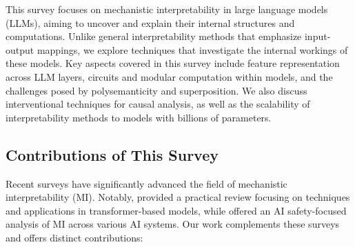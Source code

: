 \documentclass[sigconf,authoryear]{acmart}
\begin{document}
This survey focuses on mechanistic interpretability in large language models (LLMs), aiming to uncover and explain their internal structures and computations. Unlike general interpretability methods that emphasize input-output mappings, we explore techniques that investigate the internal workings of these models. Key aspects covered in this survey include feature representation across LLM layers, circuits and modular computation within models, and the challenges posed by polysemanticity and superposition. We also discuss interventional techniques for causal analysis, as well as the scalability of interpretability methods to models with billions of parameters.


\subsection{Contributions of This Survey}

Recent surveys have significantly advanced the field of mechanistic interpretability (MI). Notably, \citet{rai2024practicalreviewmechanisticinterpretability} provided a practical review focusing on techniques and applications in transformer-based models, while \citet{bereska_mechanistic_2024} offered an AI safety-focused analysis of MI across various AI systems. Our work complements these surveys and offers distinct contributions: 
\end{document}
